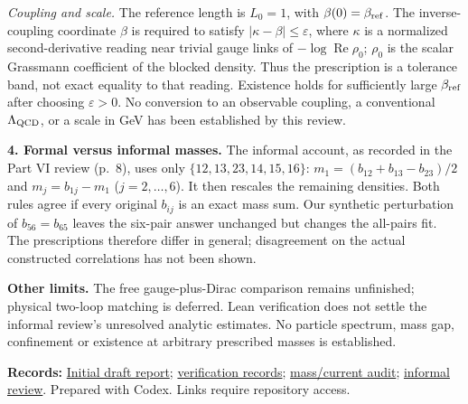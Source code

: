 \documentclass[11pt]{article}
\newcommand{\reviewdoc}[2]{\href{https://github.com/yang-mills-group/QCD/blob/main/#1}{#2}}
\begin{document}
\textit{Coupling and scale.} The reference length is $L_0=1$, with
$\beta(0)=\beta_{\rm ref}$. The inverse-coupling coordinate $\beta$ is required
to satisfy $|\kappa-\beta|\leq\varepsilon$, where $\kappa$ is a normalized
second-derivative reading near trivial gauge links of
$-\log\operatorname{Re}\rho_0$; $\rho_0$ is the scalar Grassmann coefficient
of the blocked density. Thus the prescription is a tolerance band, not
exact equality to that reading. Existence holds for sufficiently large
$\beta_{\rm ref}$ after choosing $\varepsilon>0$. No conversion to an
observable coupling, a conventional $\Lambda_{\rm QCD}$, or a scale in GeV
has been established by this review.

\textbf{4. Formal versus informal masses.}
The informal account, as recorded in the Part VI review (p.~8), uses only
$\{12,13,23,14,15,16\}$:
$m_1=(b_{12}+b_{13}-b_{23})/2$ and $m_j=b_{1j}-m_1$ ($j=2,\ldots,6$).
It then rescales the remaining densities. Both rules agree if every original
$b_{ij}$ is an exact mass sum. Our synthetic perturbation of $b_{56}=b_{65}$
leaves the six-pair answer unchanged but changes the all-pairs fit.
The prescriptions therefore differ in general; disagreement on the actual
constructed correlations has not been shown.

\textbf{Other limits.}
The free gauge-plus-Dirac comparison remains unfinished; physical two-loop
matching is deferred. Lean verification does not settle the informal
review's unresolved analytic estimates. No particle spectrum, mass gap,
confinement or existence at arbitrary prescribed masses is established.

{\small\textbf{Records:}
\reviewdoc{docs/qcd-verification-assessment.pdf}{Initial draft report};
\reviewdoc{docs/evidence.md}{verification records};
\reviewdoc{docs/mass-current-normalization.md}{mass/current audit};
\reviewdoc{docs/informal-part-VI-review-r02.pdf}{informal review}.
Prepared with Codex. Links require repository access.}
\end{document}
